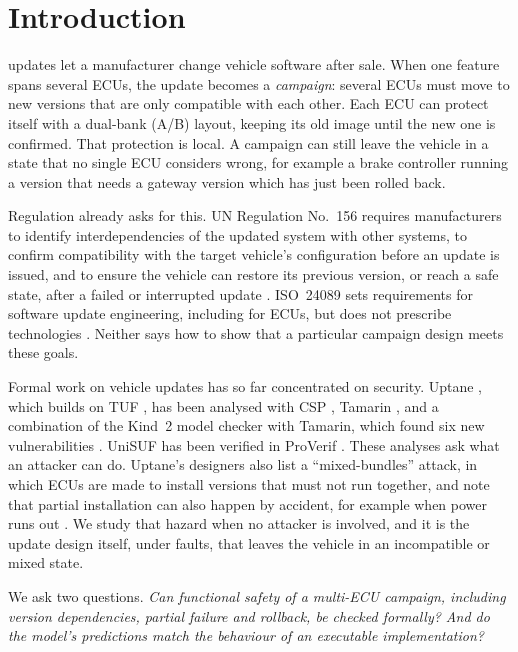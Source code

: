 \documentclass[journal]{IEEEtran}
\begin{document}
\section{Introduction}

 updates let a manufacturer change vehicle software after sale. When one feature spans several ECUs, the update becomes a \emph{campaign}: several ECUs must move to new versions that are only compatible with each other. Each ECU can protect itself with a dual-bank (A/B) layout, keeping its old image until the new one is confirmed. That protection is local. A campaign can still leave the vehicle in a state that no single ECU considers wrong, for example a brake controller running a version that needs a gateway version which has just been rolled back.

Regulation already asks for this. UN Regulation No.~156 requires manufacturers to identify interdependencies of the updated system with other systems, to confirm compatibility with the target vehicle's configuration before an update is issued, and to ensure the vehicle can restore its previous version, or reach a safe state, after a failed or interrupted update \cite{unr156}. ISO~24089 sets requirements for software update engineering, including for ECUs, but does not prescribe technologies \cite{iso24089}. Neither says how to show that a particular campaign design meets these goals.

Formal work on vehicle updates has so far concentrated on security. Uptane \cite{kuppusamy2016,kuppusamy2018}, which builds on TUF \cite{samuel2010}, has been analysed with CSP \cite{kirk2021,kirk2023}, Tamarin \cite{boureanu2023}, and a combination of the Kind~2 model checker with Tamarin, which found six new vulnerabilities \cite{lorch2024}. UniSUF has been verified in ProVerif \cite{hagen2026}. These analyses ask what an attacker can do. Uptane's designers also list a ``mixed-bundles'' attack, in which ECUs are made to install versions that must not run together, and note that partial installation can also happen by accident, for example when power runs out \cite{kuppusamy2016}. We study that hazard when no attacker is involved, and it is the update design itself, under faults, that leaves the vehicle in an incompatible or mixed state.

We ask two questions. \emph{Can functional safety of a multi-ECU campaign, including version dependencies, partial failure and rollback, be checked formally? And do the model's predictions match the behaviour of an executable implementation?}
\end{document}
